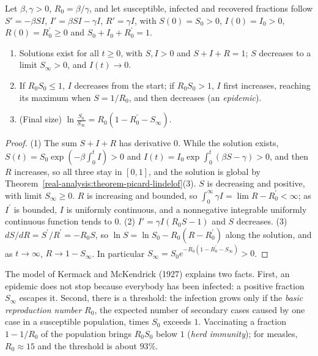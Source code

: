 \begin{proposition}\label{ordinary-differential-equations:proposition-sir}
Let $\beta, \gamma > 0$, $R_0 = \beta/\gamma$, and let susceptible, infected and recovered fractions follow $S' = -\beta SI$, $I' = \beta SI - \gamma I$, $R' = \gamma I$, with $S(0) = S_0 > 0$, $I(0) = I_0 > 0$, $R(0) = R_0^{\prime} \geq 0$ and
$S_0 + I_0 + R_0^{\prime} = 1$.
\begin{enumerate}
\item Solutions exist for all $t \geq 0$, with $S, I > 0$ and $S + I + R = 1$; $S$ decreases to a limit $S_\infty > 0$, and $I(t) \to 0$.
\item If $R_0S_0 \leq 1$, $I$ decreases from the start; if $R_0S_0 > 1$, $I$ first increases, reaching its maximum when $S = 1/R_0$, and then decreases (an \emph{epidemic}).
\item (Final size) $\ln\frac{S_0}{S_\infty} = R_0(1 - R_0^{\prime} - S_\infty)$.
\end{enumerate}
\end{proposition}

\begin{proof}
(1) The sum $S + I + R$ has derivative $0$. While the solution exists, $S(t) = S_0\exp(-\beta\int_0^tI) > 0$ and $I(t) = I_0\exp\int_0^t(\beta S - \gamma) > 0$, and then $R$ increases, so all three stay in $[0, 1]$, and the solution is global by
Theorem~\ref{real-analysis:theorem-picard-lindelof}(3). $S$ is decreasing and positive, with limit $S_\infty \geq 0$. $R$ is increasing and bounded, so $\int_0^\infty\gamma I = \lim R - R_0^{\prime} < \infty$; as $I^{\prime}$ is bounded, $I$ is
uniformly continuous, and a nonnegative integrable uniformly continuous function tends to $0$. (2) $I' = \gamma I(R_0S - 1)$ and $S$ decreases. (3) $dS/dR = S^{\prime}/R^{\prime} = -R_0S$, so $\ln S = \ln S_0 - R_0(R - R_0^{\prime})$ along the
solution, and as $t \to \infty$, $R \to 1 - S_\infty$. In particular $S_\infty = S_0e^{-R_0(1 - R_0^{\prime} - S_\infty)} > 0$.
\end{proof}

The model of Kermack and McKendrick (1927) \cite{kermack-mckendrick-1927} explains two facts. First, an epidemic does not stop because everybody has been infected: a positive fraction $S_\infty$ escapes it. Second, there is a
threshold: the infection grows only if the \emph{basic reproduction number} $R_0$, the expected number of secondary cases caused by one case in a susceptible population, times $S_0$ exceeds $1$. Vaccinating a fraction $1 - 1/R_0$ of the
population brings $R_0S_0$ below $1$ (\emph{herd immunity}); for measles, $R_0 \approx 15$ and the threshold is about $93\%$.

